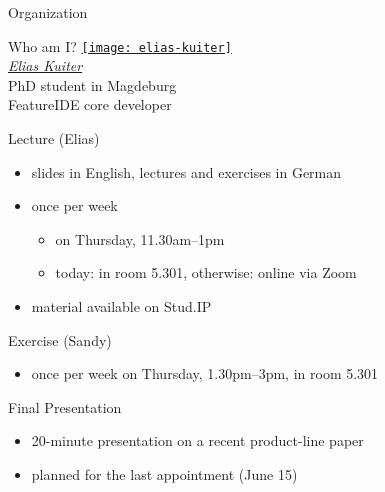 \begin{frame}{Organization}
	\begin{fancycolumns}[widths={28}]
		\begin{definition}{Who am I?}
			\centering
			\href{https://www.dbse.ovgu.de/Mitarbeiter/Elias+Kuiter.html}{\texttt{[image: elias-kuiter]}}\\[.5ex]
			\href{https://www.dbse.ovgu.de/Mitarbeiter/Elias+Kuiter.html}{\emph{Elias Kuiter}}\\[.5ex]
			\small PhD student in Magdeburg\\[.5ex]
			FeatureIDE core developer
		\end{definition}
	\nextcolumn
		\begin{note}{Lecture (Elias)}
			\begin{itemize}
				\item slides in English, lectures and exercises in German
				\item once per week
				\begin{itemize}
					\item on Thursday, 11.30am--1pm
					\item today: in room 5.301, otherwise: online via Zoom
				\end{itemize}
				\item material available on Stud.IP
			\end{itemize}
		\end{note}
		\begin{note}{Exercise (Sandy)}
			\begin{itemize}
				\item once per week on Thursday, 1.30pm--3pm, in room 5.301
			\end{itemize}
		\end{note}
		\begin{note}{Final Presentation }
			\begin{itemize}
				\item 20-minute presentation on a recent product-line paper
				\item planned for the last appointment (June 15)
			\end{itemize}
		\end{note}
	\end{fancycolumns}
\end{frame}

